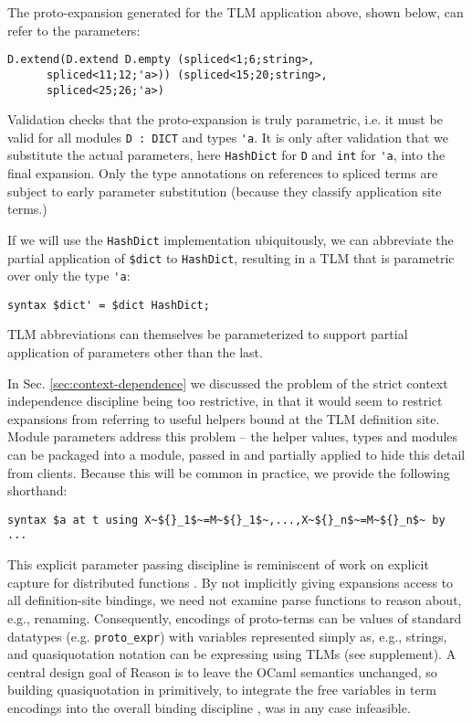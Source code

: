 \documentclass[acmsmall,review,anonymous]{acmart}\settopmatter{printfolios=true,printccs=false,printacmref=false}
\newcommand{\li}[1]{\lstinline[basicstyle=\ttfamily\fontsize{9pt}{1em}\selectfont]{#1}}
\begin{document}
The proto-expansion generated for the TLM application above, shown below, can refer to the parameters:
\begin{lstlisting}[numbers=none]
    D.extend(D.extend D.empty (spliced<1;6;string>, 
      spliced<11;12;'a>)) (spliced<15;20;string>, 
      spliced<25;26;'a>)
\end{lstlisting}
Validation checks that the proto-expansion is truly parametric, i.e. it must be valid for all modules \li{D : DICT} and types \li{'a}. It is only after validation that we substitute the actual parameters, here \li{HashDict} for \li{D} and \li{int} for \li{'a}, into the final expansion. Only the type annotations on references to spliced terms are subject to early parameter substitution (because they classify application site terms.)

If we will use the \li{HashDict} implementation ubiquitously, we can abbreviate the partial application of \li{$dict} to \li{HashDict}, resulting in a TLM that is parametric over only the type \li{'a}:
\begin{lstlisting}[numbers=none]
    syntax $dict' = $dict HashDict; 
\end{lstlisting}
TLM abbreviations can themselves be parameterized to support partial application of parameters other than the last.

In Sec. \ref{sec:context-dependence} we discussed the problem of the strict context independence discipline being too restrictive, in that it would seem to restrict expansions from referring to useful helpers bound at the TLM definition site. Module parameters address this problem -- the helper values, types and modules can be packaged into a module, passed in and partially applied to hide this detail from clients. Because this will be common in practice, we provide the following shorthand:
\begin{lstlisting}[numbers=none]
    syntax $a at t using X~${}_1$~=M~${}_1$~,...,X~${}_n$~=M~${}_n$~ by ...
\end{lstlisting} 

This explicit parameter passing discipline is reminiscent of work on explicit capture for distributed functions \cite{DBLP:conf/ecoop/MillerHO14}. By not implicitly giving expansions access to all definition-site bindings, we need not examine parse functions to reason about, e.g., renaming. Consequently, encodings of proto-terms can be values of standard datatypes (e.g. \li{proto_expr}) with variables represented simply as, e.g., strings, and quasiquotation notation can be expressing using TLMs (see supplement). A central design goal of Reason is to leave the OCaml semantics unchanged, so building quasiquotation in primitively, to integrate the free variables in term encodings into the overall binding discipline \cite{Bawd99a}, was in any case infeasible.
\end{document}
